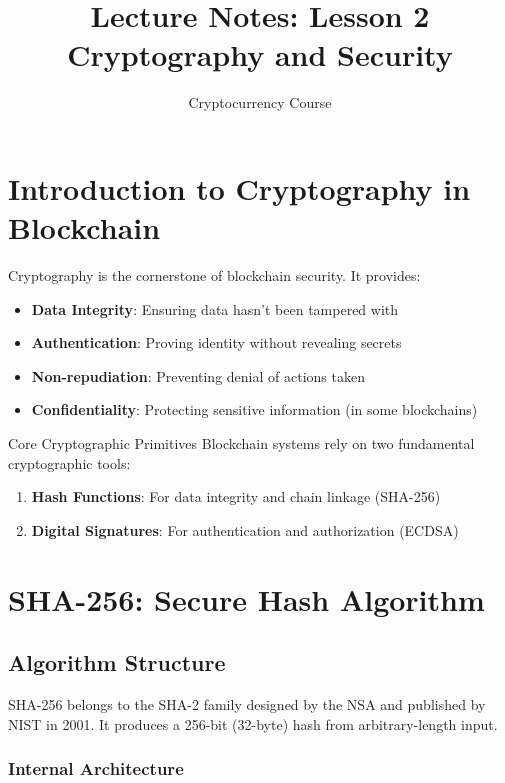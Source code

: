 \documentclass[11pt,a4paper]{article}
\title{\textbf{Lecture Notes: Lesson 2}\\Cryptography and Security}
\author{Cryptocurrency Course}
\date{}
\begin{document}
\maketitle

\tableofcontents
\newpage

\section{Introduction to Cryptography in Blockchain}

Cryptography is the cornerstone of blockchain security. It provides:
\begin{itemize}
  \item \textbf{Data Integrity}: Ensuring data hasn't been tampered with
  \item \textbf{Authentication}: Proving identity without revealing secrets
  \item \textbf{Non-repudiation}: Preventing denial of actions taken
  \item \textbf{Confidentiality}: Protecting sensitive information (in some blockchains)
\end{itemize}

\begin{keybox}{Core Cryptographic Primitives}
Blockchain systems rely on two fundamental cryptographic tools:
\begin{enumerate}
  \item \textbf{Hash Functions}: For data integrity and chain linkage (SHA-256)
  \item \textbf{Digital Signatures}: For authentication and authorization (ECDSA)
\end{enumerate}
\end{keybox}

\section{SHA-256: Secure Hash Algorithm}

\subsection{Algorithm Structure}

SHA-256 belongs to the SHA-2 family designed by the NSA and published by NIST in 2001. It produces a 256-bit (32-byte) hash from arbitrary-length input.

\subsubsection{Internal Architecture}
\end{document}
